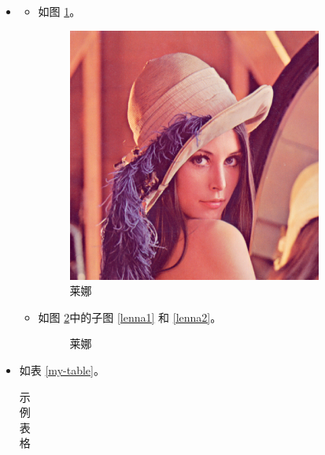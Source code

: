 \documentclass{assignment}
\begin{document}
    \begin{sol}
        \begin{itemize}
            \item[(1)]
            \begin{itemize}
                \item[(a)] 如图 \ref{Lenna}。
                \begin{figure}[hbt!]
                    \centering
                    \includegraphics[width=.2\textwidth]{Lenna.jpg}
                    \caption{莱娜}
                    \label{Lenna}
                \end{figure}
                \item[(b)] 如图 \ref{Lenna2}中的子图 \ref{lenna1} 和 \ref{lenna2}。
                \begin{figure}[hbt!]
                    \centering
                    \caption{莱娜}
                    \label{Lenna2}
                \end{figure}
            \end{itemize}
            \item[(2)] 如表 \ref{my-table}。
            \begin{center}
                \begin{longtable}{ccccc}
                    \caption{示例表格}

\end{longtable}
\end{center}
\end{itemize}
\end{sol}
\end{document}
